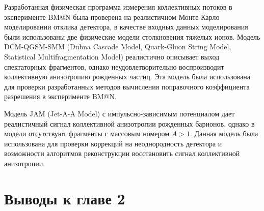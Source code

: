 Разработанная физическая программа измерения коллективных потоков в эксперименте BM@N была проверена на реалистичном Монте-Карло моделировании отклика детектора, в качестве входных данных моделирования были использованы две физические модели столкновения тяжелых ионов.
Модель DCM-QGSM-SMM (Dubna Cascade Model, Quark-Gluon String Model, Statistical Multifragmentation Model) реалистично описывает выход спектаторных фрагментов, однако неудовлетворительно воспроизводит коллективную анизотропию рожденных частиц.
Эта модель была использована для проверки разработанных методов вычисления поправочного коэффициента разрешения в эксперименте BM@N.

Модель JAM (Jet-A-A Model) с импульсно-зависимым потенциалом дает реалистичный сигнал коллективной анизотропии рожденных барионов, однако в модели отсутствуют фрагменты с массовым номером $A>1$.
Данная модель была использована для проверки коррекций на неоднородность детектора и возможности алгоритмов реконструкции восстановить сигнал коллективной анизотропии.

\section{Выводы к главе 2}

